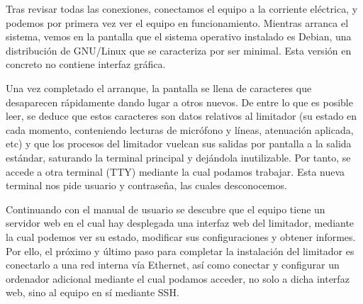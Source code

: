\label{img:lms7_open}

Tras revisar todas las conexiones, conectamos el equipo a la corriente eléctrica, y podemos por primera vez ver el equipo en funcionamiento. Mientras arranca el sistema, vemos en la pantalla que el sistema operativo instalado es Debian, una distribución de \gls{GNU/Linux} que se caracteriza por ser minimal. Esta versión en concreto no contiene interfaz gráfica.

Una vez completado el arranque, la pantalla se llena de caracteres que desaparecen rápidamente dando lugar a otros nuevos. De entre lo que es posible leer, se deduce que estos caracteres son datos relativos al limitador (su estado en cada momento, conteniendo lecturas de micrófono y líneas, atenuación aplicada, etc) y que los procesos del limitador vuelcan sus salidas por pantalla a la salida estándar, saturando la terminal principal y dejándola inutilizable. Por tanto, se accede a otra terminal (TTY) mediante la cual podamos trabajar. Esta nueva terminal nos pide usuario y contraseña, las cuales desconocemos.

Continuando con el manual de usuario se descubre que el equipo tiene un servidor web en el cual hay desplegada una interfaz web del limitador, mediante la cual podemos ver su estado, modificar sus configuraciones y obtener informes. Por ello, el próximo y último paso para completar la instalación del limitador es conectarlo a una red interna vía Ethernet, así como conectar y configurar un ordenador adicional mediante el cual podamos acceder, no solo a dicha interfaz web, sino al equipo en sí mediante \acrshort{SSH}.


